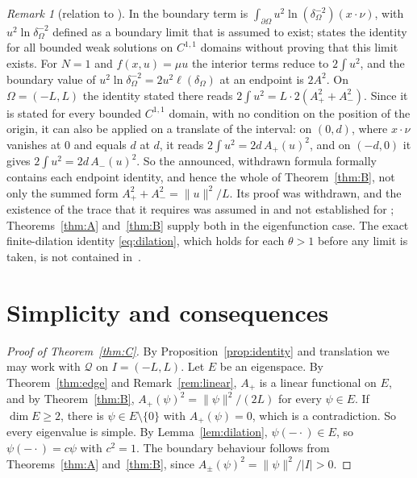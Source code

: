 \documentclass[11pt]{amsart}
\theoremstyle{definition}
\theoremstyle{remark}
\newtheorem{remark}[theorem]{Remark}
\numberwithin{equation}{section}
\begin{document}
\begin{remark}[relation to {\cite{AGV24}}]\label{rem:AGV}
In \cite[Thm.~2.3]{AGV24} the boundary term is $\int_{\partial\Omega}u^2\ln(\delta_\Omega^{-2})(x\cdot\nu)$, with $u^2\ln\delta_\Omega^{-2}$ defined as a boundary limit that is assumed to exist; \cite[Cor.~3.8]{AGV24} states the identity for all bounded weak solutions on $C^{1,1}$ domains without proving that this limit exists. For $N=1$ and $f(x,u)=\mu u$ the interior terms reduce to $2\int u^2$, and the boundary value of $u^2\ln\delta_\Omega^{-2}=2u^2\ell(\delta_\Omega)$ at an endpoint is $2A^2$. On $\Omega=(-L,L)$ the identity stated there reads $2\int u^2=L\cdot2(A_+^2+A_-^2)$. Since it is stated for every bounded $C^{1,1}$ domain, with no condition on the position of the origin, it can also be applied on a translate of the interval: on $(0,d)$, where $x\cdot\nu$ vanishes at $0$ and equals $d$ at $d$, it reads $2\int u^2=2d\,A_+(u)^2$, and on $(-d,0)$ it gives $2\int u^2=2d\,A_-(u)^2$. So the announced, withdrawn formula formally contains each endpoint identity, and hence the whole of Theorem~\ref{thm:B}, not only the summed form $A_+^2+A_-^2=\|u\|^2/L$. Its proof was withdrawn, and the existence of the trace that it requires was assumed in \cite[Thm.~2.3]{AGV24} and not established for \cite[Cor.~3.8]{AGV24}; Theorems~\ref{thm:A} and~\ref{thm:B} supply both in the eigenfunction case. The exact finite-dilation identity \eqref{eq:dilation}, which holds for each $\theta>1$ before any limit is taken, is not contained in~\cite{AGV24}.
\end{remark}

\section{Simplicity and consequences}\label{sec:simple}

\begin{proof}[Proof of Theorem~\ref{thm:C}]
By Proposition~\ref{prop:identity} and translation we may work with $\mathcal Q$ on $I=(-L,L)$. Let $E$ be an eigenspace. By Theorem~\ref{thm:edge} and Remark~\ref{rem:linear}, $A_+$ is a linear functional on $E$, and by Theorem~\ref{thm:B}, $A_+(\psi)^2=\|\psi\|^2/(2L)$ for every $\psi\in E$. If $\dim E\ge2$, there is $\psi\in E\setminus\{0\}$ with $A_+(\psi)=0$, which is a contradiction. So every eigenvalue is simple. By Lemma~\ref{lem:dilation}, $\psi(-\cdot)\in E$, so $\psi(-\cdot)=c\psi$ with $c^2=1$. The boundary behaviour follows from Theorems~\ref{thm:A} and~\ref{thm:B}, since $A_\pm(\psi)^2=\|\psi\|^2/|I|>0$.
\end{proof}
\end{document}
